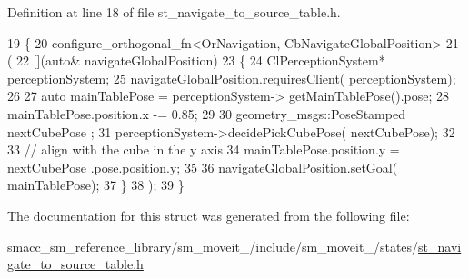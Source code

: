 Definition at line 18 of file st\+\_\+navigate\+\_\+to\+\_\+source\+\_\+table.\+h.


\begin{DoxyCode}
19         \{
20             configure\_orthogonal\_fn<OrNavigation, CbNavigateGlobalPosition>
21                                                             (
22                                                                 [](\textcolor{keyword}{auto}& navigateGlobalPosition)
23                                                                 \{
24                                                                     ClPerceptionSystem* perceptionSystem;
25                                                                     navigateGlobalPosition.requiresClient(
      perceptionSystem);
26                                                                     
27                                                                     \textcolor{keyword}{auto} mainTablePose = perceptionSystem->
      getMainTablePose().pose;
28                                                                     mainTablePose.position.x -= 0.85;
29 
30                                                                     geometry\_msgs::PoseStamped nextCubePose
      ;
31                                                                     perceptionSystem->decidePickCubePose(
      nextCubePose);
32 
33                                                                     \textcolor{comment}{// align with the cube in the y axis}
34                                                                     mainTablePose.position.y = nextCubePose
      .pose.position.y;
35 
36                                                                     navigateGlobalPosition.setGoal(
      mainTablePose);
37                                                                 \}
38                                                             );
39         \}
\end{DoxyCode}


The documentation for this struct was generated from the following file\+:\begin{DoxyCompactItemize}
\item 
smacc\+\_\+sm\+\_\+reference\+\_\+library/sm\+\_\+moveit\+\_/include/sm\+\_\+moveit\+\_/states/\hyperlink{st__navigate__to__source__table_8h}{st\+\_\+navigate\+\_\+to\+\_\+source\+\_\+table.\+h}\end{DoxyCompactItemize}
